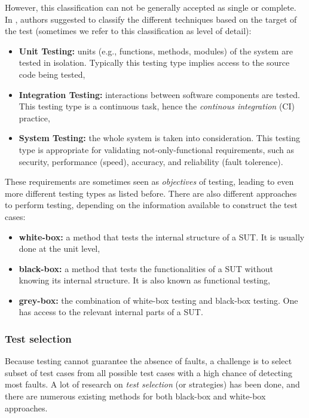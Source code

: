 However, this classification can not be generally accepted as
single or complete. In \cite{4425813}, authors suggested to
classify the different techniques based on the target of the
test (sometimes we refer to this classification as level of
detail):

\begin{itemize}
\item \textbf{Unit Testing:} units (e.g., functions, methods,
modules) of the system are tested in isolation. Typically this
testing type implies access to the source code being tested,

\item \textbf{Integration Testing:} interactions between software
components are tested. This testing type is a continuous task,
hence the \textit{continous integration} (CI) practice,

\item \textbf{System Testing:} the whole system is taken into
consideration. This testing type is appropriate for validating
not-only-functional requirements, such as security, performance
(speed), accuracy, and reliability (fault tolerence).
\end{itemize}

These requirements are sometimes seen as \textit{objectives} of
testing, leading to even more different testing types as listed
before. There are also different approaches to perform testing,
depending on the information available to construct the test
cases:

\begin{itemize}
\item \textbf{white-box:} a method that tests the internal
structure of a SUT. It is usually done at the unit level,

\item \textbf{black-box:} a method that tests the functionalities
of a SUT without knowing its internal structure.  It is also
known as functional testing,

\item \textbf{grey-box:} the combination of white-box testing and
black-box testing. One has access to the relevant internal parts
of a SUT.
\end{itemize}

\subsubsection{Test selection}

Because testing cannot guarantee the absence of faults, a
challenge is to select subset of test cases from all possible
test cases with a high chance of detecting most faults. A lot of
research on \textit{test selection} (or strategies) has been
done, and there are numerous existing methods for both black-box
and white-box approaches.

